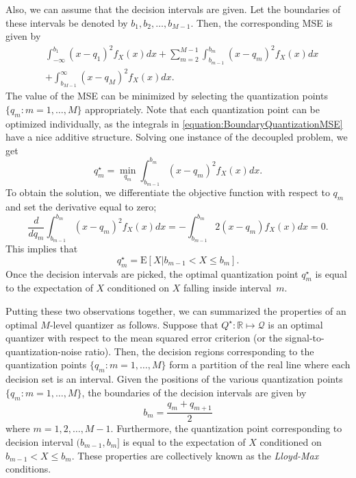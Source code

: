 Also, we can assume that the decision intervals are given.
Let the boundaries of these intervals be denoted by $b_1, b_2, \ldots, b_{M-1}$.
Then, the corresponding MSE is given by
\begin{equation} \label{equation:BoundaryQuantizationMSE}
\begin{split}
&\int_{-\infty}^{b_1} (x - q_1)^2 f_X(x) dx
+ \sum_{m=2}^{M-1}
\int_{b_{m-1}}^{b_m} (x - q_m)^2 f_X(x) dx \\
&+ \int_{b_{M-1}}^{\infty} (x - q_M)^2 f_X(x) dx .
\end{split}
\end{equation}
The value of the MSE can be minimized by selecting the quantization points $\{ q_m : m = 1, \ldots, M \}$ appropriately.
Note that each quantization point can be optimized individually, as the integrals in \eqref{equation:BoundaryQuantizationMSE} have a nice additive structure.
Solving one instance of the decoupled problem, we get
\begin{equation*}
q_m^{\star} = \min_{q_m} \int_{b_{m-1}}^{b_m} (x - q_m)^2 f_X(x) dx .
\end{equation*}
To obtain the solution, we differentiate the objective function with respect to $q_m$ and set the derivative equal to zero;
\begin{equation*}
\frac{d}{d q_m} \int_{b_{m-1}}^{b_m} (x - q_m)^2 f_X(x) dx
= - \int_{b_{m-1}}^{b_m} 2 (x - q_m) f_X(x) dx = 0 .
\end{equation*}
This implies that
\begin{equation*}
q_m^{\star} = \mathrm{E} [ X | b_{m-1} < X \leq b_m ] .
\end{equation*}
Once the decision intervals are picked, the optimal quantization point $q_m^{\star}$ is equal to the expectation of $X$ conditioned on $X$ falling inside interval~$m$.

Putting these two observations together, we can summarized the properties of an optimal $M$-level quantizer as follows.
Suppose that $Q^{\star} : \mathbb{R} \mapsto \mathcal{Q}$ is an optimal quantizer with respect to the mean squared error criterion (or the signal-to-quantization-noise ratio).
Then, the decision regions corresponding to the quantization points $\{ q_m : m = 1, \ldots, M \}$ form a partition of the real line where each decision set is an interval.
Given the positions of the various quantization points $\{ q_m : m = 1, \ldots, M \}$, the boundaries of the decision intervals are given by
\begin{equation*}
b_m = \frac{q_m + q_{m+1}}{2}
\end{equation*}
where $m = 1, 2, \ldots, M-1$.
Furthermore, the quantization point corresponding to decision interval $(b_{m-1}, b_m]$ is equal to the expectation of $X$ conditioned on $b_{m-1} < X \leq b_m$.
These properties are collectively known as the \emph{Lloyd-Max} conditions.


